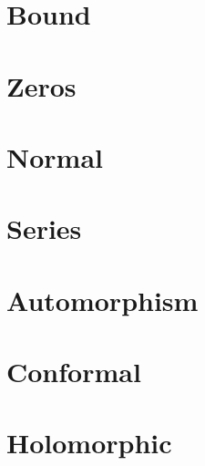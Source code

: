 \documentclass[12pt,letterpaper]{article}
\begin{document}
\section{Bound}
\begin{itemize}\setlength\itemsep{4em}\onlyitems[none, include=bound]
\mylist
\end{itemize}
\newpage

\section{Zeros}
\begin{itemize}\setlength\itemsep{4em}\onlyitems[none, include=zeros]
\mylist
\end{itemize}
\newpage

\section{Normal}
\begin{itemize}\setlength\itemsep{4em}\onlyitems[none, include=normal]
\mylist
\end{itemize}
\newpage

\section{Series}
\begin{itemize}\setlength\itemsep{4em}\onlyitems[none, include=series]
\mylist
\end{itemize}
\newpage

\section{Automorphism}
\begin{itemize}\setlength\itemsep{4em}\onlyitems[none, include=automorphism]
\mylist
\end{itemize}
\newpage

\section{Conformal}
\begin{itemize}\setlength\itemsep{4em}\onlyitems[none, include=conformal]
\mylist
\end{itemize}
\newpage

\section{Holomorphic}
\begin{itemize}\setlength\itemsep{4em}\onlyitems[none, include=holomorphic]
\mylist
\end{itemize}
\newpage
\end{document}
